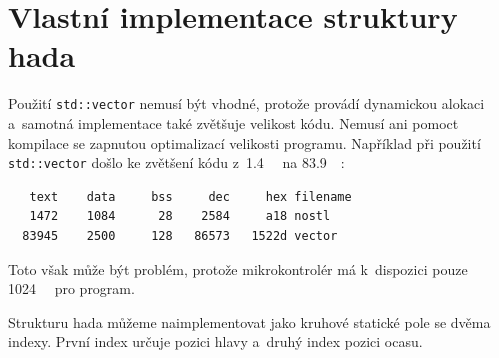 \documentclass[12pt]{article}
\begin{document}
\section{Vlastní implementace struktury hada}
Použití \texttt{std::vector} nemusí být vhodné, protože provádí dynamickou alokaci a~samotná implementace také zvětšuje velikost kódu.
Nemusí ani pomoct kompilace se zapnutou optimalizací velikosti programu.
Například při použití \texttt{std::vector} došlo ke zvětšení kódu z~\SI{1.4}{\kilo\byte} na \SI{83.9}{\kilo \byte}:
\begin{verbatim}
   text    data     bss     dec     hex filename
   1472    1084      28    2584     a18 nostl
  83945    2500     128   86573   1522d vector
\end{verbatim}
Toto však může být problém, protože mikrokontrolér má k~dispozici pouze \SI{1024}{\kilo\byte} pro program.

Strukturu hada můžeme naimplementovat jako kruhové statické pole se dvěma indexy.
První index určuje pozici hlavy a~druhý index pozici ocasu.
\end{document}

